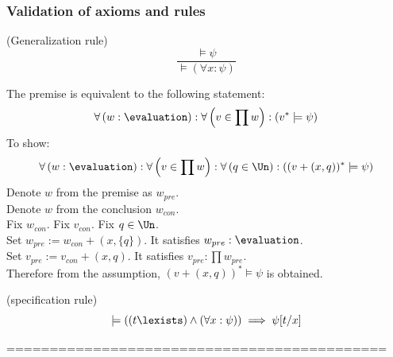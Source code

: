 \subsubsection{Validation of axioms and rules}
\begin{theorem}(Generalization rule)
\[
\frac{
\models \psi
}{
\models (\forall x:\psi)
}
\]
\end{theorem}
\Proof
The premise is equivalent to the following statement:
\[
\forall \left(w:\evaluation\right):
\forall \left(v\in\prod w\right):
(v^*\models \psi)
\]
To show:
\[
\forall \left(w:\evaluation\right):
\forall \left(v\in\prod w\right):
\forall \left(q\in\Un\right):
((v+(x,q))^*\models \psi)
\]
Denote $w$ from the premise as $w_{pre}$.\\
Denote $w$ from the conclusion $w_{con}$.\\
Fix $w_{con}$. Fix $v_{con}$. Fix $q\in\Un$.\\
Set $w_{pre}:= w_{con} + (x,\{q\})$. It satisfies $w_{pre}:\evaluation$.\\
Set $v_{pre}:= v_{con} + (x,q)$. It satisfies $v_{pre}:\prod w_{pre}$.\\
Therefore from the assumption, $(v+(x,q))^*\models \psi$ is obtained.\\
\Done

\begin{theorem}(specification rule)
\[
\models ((t\lexists)\land(\forall x:\psi))\implies\psi[t/x]
\]
\end{theorem}
\Proof
\Done


============================================\\
